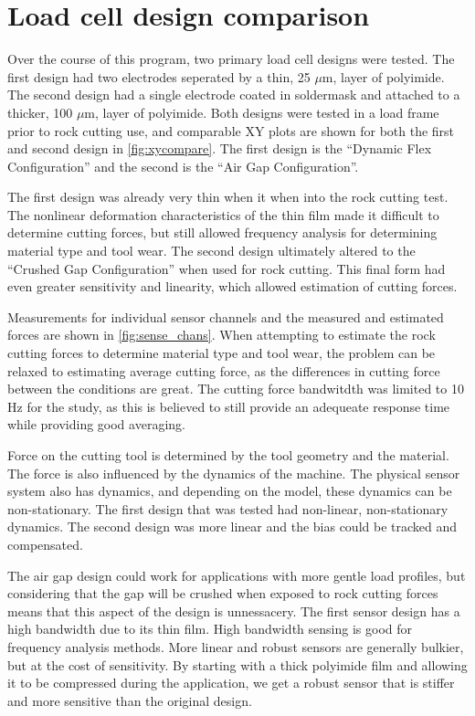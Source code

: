 \chapter{Load cell design comparison
\label{chap:8}}

Over the course of this program, two primary load cell designs were tested.
The first design had two electrodes seperated by a thin, 25 $\mu$m, layer of polyimide.
The second design had a single electrode coated in soldermask 
and attached to a thicker, 100 $\mu$m, layer of polyimide.
Both designs were tested in a load frame prior to rock cutting use,
and comparable XY plots are shown for both the first and second design
in \ref{fig:xycompare}. The first design is the ``Dynamic Flex Configuration'' 
and the second is the ``Air Gap Configuration''.

The first design was already very thin when it when into the rock cutting test.
The nonlinear deformation characteristics of the thin film made it difficult to determine
cutting forces, but still allowed frequency analysis for determining material type and tool wear.
The second design ultimately altered to the ``Crushed Gap Configuration'' when used for rock cutting.
This final form had even greater sensitivity and linearity, which allowed estimation of cutting forces.

Measurements for individual sensor channels and the measured 
and estimated forces are shown in \ref{fig:sense_chans}.
When attempting to estimate the rock cutting forces to determine material type and tool wear, 
the problem can be relaxed to estimating average cutting force, as the differences in 
cutting force between the conditions are great.
The cutting force bandwitdth was limited to 10 Hz for the study, as this is believed to still
provide an adequeate response time while providing good averaging.

Force on the cutting tool is determined by the tool geometry and the material.
The force is also influenced by the dynamics of the machine.
The physical sensor system also has dynamics, and depending on the model, 
these dynamics can be non-stationary.
The first design that was tested had non-linear, non-stationary dynamics.
The second design was more linear and the bias could be tracked and compensated.

The air gap design could work for applications with more gentle load profiles,
but considering that the gap will be crushed when exposed to rock cutting forces 
means that this aspect of the design is unnessacery. The first sensor design
has a high bandwidth due to its thin film. 
High bandwidth sensing is good for frequency analysis methods.
More linear and robust sensors are generally bulkier, but at the cost of sensitivity.
By starting with a thick polyimide film and allowing it to be compressed during the application,
we get a robust sensor that is stiffer and more sensitive than the original design.


